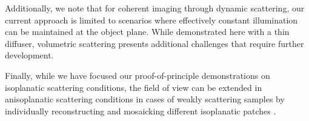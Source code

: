 \documentclass[pdflatex,sn-mathphys-num]{sn-jnl}%
\theoremstyle{thmstyleone}%
\theoremstyle{thmstyletwo}%
\theoremstyle{thmstylethree}%
\begin{document}


Additionally, we note that for coherent imaging through dynamic scattering, our current approach is limited to scenarios where effectively constant illumination can be maintained at the object plane. While demonstrated here with a thin diffuser, volumetric scattering presents additional challenges that require further development.

Finally, while we have focused our proof-of-principle demonstrations on isoplanatic scattering conditions, the field of view can be extended in anisoplanatic scattering conditions in cases of weakly scattering samples by individually reconstructing and mosaicking different isoplanatic patches \cite{trussell1978sectioned,alterman2021imaging,lee22,najar2024harnessing,sunray2024beyond}.
\end{document}
